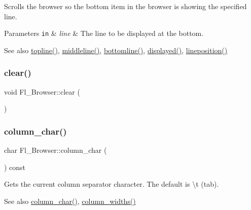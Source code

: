 Scrolls the browser so the bottom item in the browser is showing the specified {\ttfamily line}. 
\begin{DoxyParams}[1]{Parameters}
\mbox{\tt in}  & {\em line} & The line to be displayed at the bottom. \\
\hline
\end{DoxyParams}
\begin{DoxySeeAlso}{See also}
\hyperlink{class_fl___browser_a4064f948e0191a8d7a0a4b39aaa632cd}{topline()}, \hyperlink{class_fl___browser_aeed63f2ef05839563c626c349fc40292}{middleline()}, \hyperlink{class_fl___browser_ad74d4d85549d4563a584ab0759832f6d}{bottomline()}, \hyperlink{class_fl___browser_aae4acb216ae3ae6261bd06fb9457e804}{displayed()}, \hyperlink{class_fl___browser_ab1266ecc779babeef0825e935d873dff}{lineposition()} 
\end{DoxySeeAlso}
\mbox{\label{class_fl___browser_a5dfce5f5c42d872865d39e65faba6073}} 
\subsubsection{\texorpdfstring{clear()}{clear()}}
{\footnotesize\ttfamily void Fl\+\_\+\+Browser\+::clear (\begin{DoxyParamCaption}{ }\end{DoxyParamCaption})}

\mbox{\label{class_fl___browser_ab27dc1a532ccd1c370820229cc1b99f6}} 
\subsubsection{\texorpdfstring{column\+\_\+char()}{column\_char()}\hspace{0.1cm}{\footnotesize\ttfamily [1/2]}}
{\footnotesize\ttfamily char Fl\+\_\+\+Browser\+::column\+\_\+char (\begin{DoxyParamCaption}{ }\end{DoxyParamCaption}) const\hspace{0.3cm}{\ttfamily [inline]}}

Gets the current column separator character. The default is \textquotesingle{}\textbackslash{}t\textquotesingle{} (tab). \begin{DoxySeeAlso}{See also}
\hyperlink{class_fl___browser_ab27dc1a532ccd1c370820229cc1b99f6}{column\+\_\+char()}, \hyperlink{class_fl___browser_a4a473cbb2e5f5d54b63549704a3a0dd0}{column\+\_\+widths()} 
\end{DoxySeeAlso}
\mbox{\label{class_fl___browser_a9343f3861915cb5a99ecaad113f82123}} 
